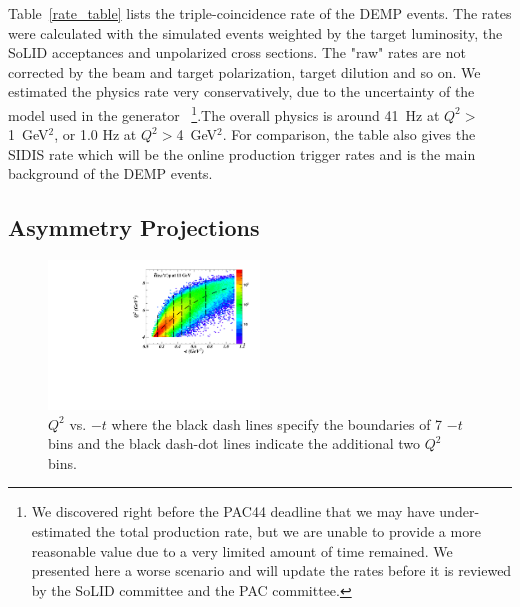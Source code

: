 Table~\ref{rate_table} lists the triple-coincidence rate of the DEMP
events. The rates were calculated with the simulated events weighted by the
target luminosity, the SoLID acceptances and unpolarized cross sections. 
The "raw" rates are not corrected by the beam and target polarization, target dilution
and so on.  We estimated the physics rate very conservatively, due to the uncertainty of the model used in the generator
~\footnote{We discovered right before the PAC44 deadline that we may have under-estimated the total production rate,
but we are unable to provide a more reasonable value due to a very limited amount of time remained. We presented here a worse scenario and will update the rates before it is reviewed by the SoLID committee and the PAC committee.}.The overall physics is around 41~Hz at $Q^{2}>$1~GeV$^{2}$,
 or 1.0 Hz at $Q^{2}>$4~GeV$^{2}$. For comparison, the table also gives the SIDIS rate
which will be the online production trigger rates and is the main background of
the DEMP events. 

\subsection{Asymmetry Projections}
\begin{figure}[!ht]
 \begin{center}
      \includegraphics[type=pdf,
        ext=.pdf,read=.pdf,width=0.5\textwidth]{./figures/E11_Q2_t_bin_Fermi} 
    \caption[$Q^{2}$ vs. $-t$]{\footnotesize{$Q^{2}$ vs. $-t$ where the black
dash lines specify the boundaries of 7 $-t$ bins and the black dash-dot lines
indicate the additional two $Q^{2}$ bins. }}
  \label{Q2_t_bin}
  \end{center}
\end{figure}

